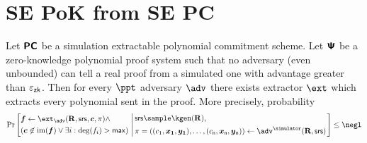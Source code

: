 \documentclass[runningheads,11pt]{llncs}
\begin{document}
\section{SE PoK from SE PC}
\begin{lemma}
  Let $\bm{\mathsf{PC}}$ be a simulation extractable polynomial commitment scheme. Let
  $\bm{\mathsf{\Psi}}$ be a zero-knowledge polynomial proof system such that no adversary (even
  unbounded) can tell a real proof from a simulated one with advantage greater
  than $\varepsilon_{\mathsf{zk}}$. Then for every $\ppt$ adversary $\adv$ there exists extractor
  $\ext$ which extracts every polynomial sent in the proof. More precisely,
  probability
  \[
    \Pr\left[
      \begin{aligned}
        & \vec{f} \gets \ext_\adv(\REL, \srs, \vec{c}, \zkproof) \land \\
        & (\vec{c} \not\in \image(\vec{f}) \lor \exists i: \deg(f_i) > \maxdeg)
        \end{aligned}
      \, \left| \,
        \begin{aligned}
          & \srs \sample \kgen(\REL), \\
          & \zkproof = ((c_1, \vec{x_1}, \vec{y_{1}}), \ldots, (c_\plen,
          \vec{x}_\plen, \vec{y}_{\plen})) \gets \adv^{\simulator}(\REL, \srs)
        \end{aligned}
        \right.
    \right] \leq \negl
  \]
\end{lemma}
\end{document}
